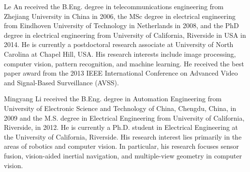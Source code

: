 \documentclass[10pt,journal]{IEEEtran}
\begin{document}
\begin{IEEEbiography}{Le An} received the B.Eng. degree in telecommunications engineering from Zhejiang University in China in 2006, the MSc degree in electrical engineering from Eindhoven University of Technology in Netherlands in 2008, and the PhD degree in electrical engineering from University of California, Riverside in USA in 2014. He is currently a postdoctoral research associate at University of North Carolina at Chapel Hill, USA.  
His research interests include image processing, computer vision, pattern recognition, and machine learning. He received the best paper award from the 2013 IEEE International Conference on Advanced Video and Signal-Based Surveillance (AVSS).
\end{IEEEbiography}

\begin{IEEEbiography}{Mingyang Li} received the B.Eng. degree in Automation Engineering from University of Electronic Science and Technology of China, Chengdu, China, in 2009 and the M.S. degree in
Electrical Engineering from University of California, Riverside, in 2012.
He is currently a Ph.D. student in Electrical Engineering at the University of California, Riverside. His research interest lies primarily in the areas of robotics and computer vision. In particular, his research focuses sensor fusion, vision-aided inertial navigation, and multiple-view geometry in computer vision. 
\end{IEEEbiography}
\end{document}
